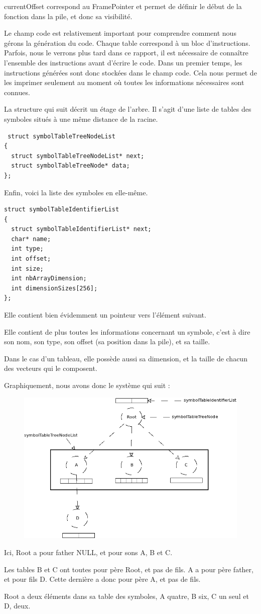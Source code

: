 currentOffset correspond au FramePointer et permet de définir le début de la fonction dans la pile, et donc sa visibilité.

Le champ code est relativement important pour comprendre comment nous gérons la génération du code. Chaque table correspond à un bloc d'instructions. Parfois, nous le verrons plus tard dans ce rapport, il est nécessaire de connaître l'ensemble des instructions avant d'écrire le code. Dans un premier temps, les instructions générées sont donc stockées dans le champ code. Cela nous permet de les imprimer seulement au moment où toutes les informations nécessaires sont connues.


\vspace{0.5cm}
La structure qui suit décrit un étage de l'arbre. Il s'agit d'une liste de tables des symboles situés à une même distance de la racine.

\begin{verbatim} 
 struct symbolTableTreeNodeList
{
  struct symbolTableTreeNodeList* next;
  struct symbolTableTreeNode* data;
};
\end{verbatim} 

\vspace{0.5cm}
Enfin, voici la liste des symboles en elle-même.

\begin{verbatim}
struct symbolTableIdentifierList
{
  struct symbolTableIdentifierList* next;
  char* name;
  int type;
  int offset;
  int size;
  int nbArrayDimension;
  int dimensionSizes[256];
};
\end{verbatim} 
 
Elle contient bien évidemment un pointeur vers l'élément suivant.

Elle contient de plus toutes les informations concernant un symbole, c'est à dire son nom, son type, son offset (sa position dans la pile), et sa taille.

Dans le cas d'un tableau, elle possède aussi sa dimension, et la taille de chacun des vecteurs qui le composent.

\vspace{0.5cm}
\newpage
Graphiquement, nous avons donc le système qui suit : 

\begin{figure}[h!]
\includegraphics[scale=0.5]{arbresym.png}
\end{figure}

Ici, Root a pour father NULL, et pour sons A, B et C.

Les tables B et C ont toutes pour père Root, et pas de fils.
A a pour père father, et pour fils D. Cette dernière a donc pour père A, et pas de fils.

Root a deux éléments dans sa table des symboles, A quatre, B six, C un seul et D, deux.